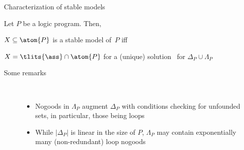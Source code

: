 \begin{frame}{Characterization of stable models}
\bigskip
\begin{theorem}
Let $P$ be a logic program. Then,

\qquad $X\subseteq\atom{P}$ is a stable model of~$P$ \alert{iff}

\qquad $X=\tlits{\ass}\cap\atom{P}$ for a (unique)
solution \ass\ for $\Delta_P\cup\Lambda_P$
\end{theorem}
\bigskip
\pause
\begin{description}
\item [Some remarks] \
\begin{itemize}
\item
Nogoods in $\Lambda_P$ augment $\Delta_P$
with conditions checking for \alert{unfounded sets},
in particular,
those being loops
\item
While $|\Delta_P|$ is linear in the size of $P$,
$\Lambda_P$ may contain \alert{exponentially many} (non-redundant) loop nogoods
\end{itemize}
\end{description}
\end{frame}
%
